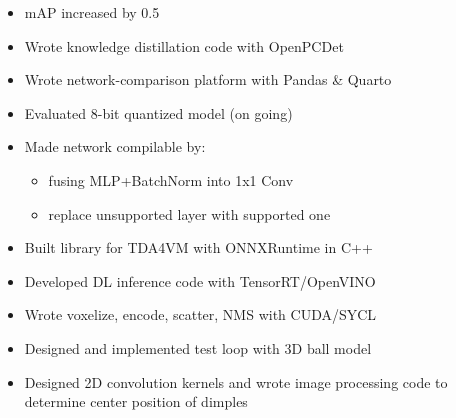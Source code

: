 \documentclass[10pt,a4paper,ragged2e,withhyper]{altacv}
\begin{document}
\begin{paracol}{2}
  \begin{itemize}
    \item mAP increased by 0.5
    \item Wrote knowledge distillation code with OpenPCDet
    \item Wrote network-comparison platform with Pandas \& Quarto
  \end{itemize}

  \divider
 
  \begin{itemize}
    \item Evaluated 8-bit quantized model (on going)
    \item Made network compilable by:
    \smallskip
    \begin{itemize}
      \item fusing MLP+BatchNorm into 1x1 Conv
      \item replace unsupported layer with supported one%
  \end{itemize}
    \item Built library for TDA4VM with ONNXRuntime in C++
  \end{itemize}

  \divider

  \begin{itemize}{}{}{}
    \item Developed DL inference code with TensorRT/OpenVINO
    \item Wrote voxelize, encode, scatter, NMS with CUDA/SYCL
  \end{itemize}

  \divider

  \begin{itemize}
    \item Designed and implemented test loop with 3D ball model
    \item Designed 2D convolution kernels and wrote image processing code to determine center position of dimples
  \end{itemize}


\end{paracol}
\end{document}
